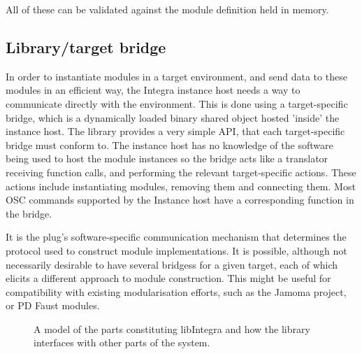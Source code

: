 All of these can be validated against the module definition held in memory.
 
\subsection{Library/target bridge}\label{subsec:bridge}

In order to instantiate modules in a target environment, and send data
to these modules in an efficient way, the Integra instance host needs
a way to communicate directly with the environment. This is done using
a target-specific bridge, which is a dynamically loaded binary shared
object hosted 'inside' the instance host. The library provides a very
simple API, that each target-specific bridge must conform to. The
instance host has no knowledge of the software being used to host the
module instances so the bridge acts like a translator receiving
function calls, and performing the relevant target-specific actions.
These actions include instantiating modules, removing them and
connecting them. Most OSC commands supported by the Instance host have
a corresponding function in the bridge.

It is the plug's software-specific communication mechanism that
determines the protocol used to construct module implementations. It
is possible, although not necessarily desirable to have several
bridgess for a given target, each of which elicits a different
approach to module construction. This might be useful for
compatibility with existing modularisation efforts, such as the Jamoma
project, or PD Faust modules.

\begin{figure}
\centerline{}
\caption{A model of the parts constituting libIntegra and how the library interfaces with other parts of the system.}
\label{fig:model}
\end{figure}

